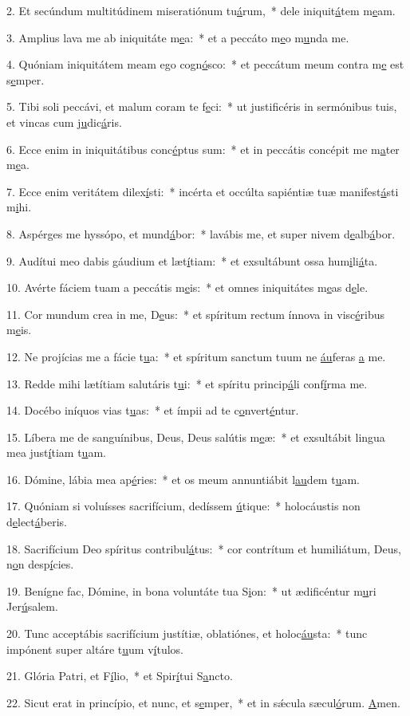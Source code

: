 2. Et secúndum multitúdinem miseratiónum tu\uline{á}rum,~* dele iniquit\uline{á}tem m\uline{e}am.\par 
3. Amplius lava me ab iniquitáte m\uline{e}a:~* et a peccáto m\uline{e}o m\uline{u}nda me.\par 
4. Quóniam iniquitátem meam ego cogn\uline{ó}sco:~* et peccátum meum contra m\uline{e} est s\uline{e}mper.\par 
5. Tibi soli peccávi, et malum coram te f\uline{e}ci:~* ut justificéris in sermónibus tuis, et vincas cum j\uline{u}dic\uline{á}ris.\par 
6. Ecce enim in iniquitátibus conc\uline{é}ptus sum:~* et in peccátis concépit me m\uline{a}ter m\uline{e}a.\par 
7. Ecce enim veritátem dilex\uline{í}sti:~* incérta et occúlta sapiéntiæ tuæ manifest\uline{á}sti m\uline{i}hi.\par 
8. Aspérges me hyssópo, et mund\uline{á}bor:~* lavábis me, et super nivem d\uline{e}alb\uline{á}bor.\par 
9. Audítui meo dabis gáudium et læt\uline{í}tiam:~* et exsultábunt ossa hum\uline{i}li\uline{á}ta.\par 
10. Avérte fáciem tuam a peccátis m\uline{e}is:~* et omnes iniquitátes m\uline{e}as d\uline{e}le.\par 
11. Cor mundum crea in me, D\uline{e}us:~* et spíritum rectum ínnova in visc\uline{é}ribus m\uline{e}is.\par 
12. Ne projícias me a fácie t\uline{u}a:~* et spíritum sanctum tuum ne \uline{áu}feras \uline{a} me.\par 
13. Redde mihi lætítiam salutáris t\uline{u}i:~* et spíritu princip\uline{á}li conf\uline{í}rma me.\par 
14. Docébo iníquos vias t\uline{u}as:~* et ímpii ad te c\uline{o}nvert\uline{é}ntur.\par 
15. Líbera me de sanguínibus, Deus, Deus salútis m\uline{e}æ:~* et exsultábit lingua mea just\uline{í}tiam t\uline{u}am.\par 
16. Dómine, lábia mea ap\uline{é}ries:~* et os meum annuntiábit l\uline{au}dem t\uline{u}am.\par 
17. Quóniam si voluísses sacrifícium, dedíssem \uline{ú}tique:~* holocáustis non d\uline{e}lect\uline{á}beris.\par 
18. Sacrifícium Deo spíritus contribul\uline{á}tus:~* cor contrítum et humiliátum, Deus, n\uline{o}n desp\uline{í}cies.\par 
19. Benígne fac, Dómine, in bona voluntáte tua S\uline{i}on:~* ut ædificéntur m\uline{u}ri Jer\uline{ú}salem.\par 
20. Tunc acceptábis sacrifícium justítiæ, oblatiónes, et holoc\uline{áu}sta:~* tunc impónent super altáre t\uline{u}um v\uline{í}tulos.\par 
21. Glória Patri, et F\uline{í}lio,~* et Spir\uline{í}tui S\uline{a}ncto.\par 
22. Sicut erat in princípio, et nunc, et s\uline{e}mper,~* et in sǽcula sæcul\uline{ó}rum. \uline{A}men.\par 
